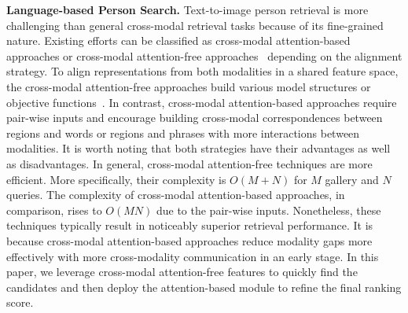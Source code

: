 \documentclass[sigconf]{acmart}
\begin{document}
\textbf{Language-based Person Search.}
Text-to-image person retrieval is more challenging than general cross-modal retrieval tasks because of its fine-grained nature. 
Existing efforts can be classified as cross-modal attention-based~\cite{li2017person, wang2022look, shu2023see, shao2022learning} approaches or cross-modal attention-free approaches~\cite{ding2021semantically, zheng2020dual, wang2022caibc, chen2022tipcb} depending on the alignment strategy.
To align representations from both modalities in a shared feature space, 
the cross-modal attention-free approaches build various model structures or objective functions~\cite{zheng2020dual}. 
In contrast, cross-modal attention-based approaches require pair-wise inputs and
encourage building cross-modal correspondences between regions and words or regions and phrases with more interactions between modalities. 
It is worth noting that both strategies have their advantages as well as disadvantages. 
In general, cross-modal attention-free techniques are more efficient. More specifically, their complexity is $O(M+N)$ for $M$ gallery and $N$ queries. 
The complexity of cross-modal attention-based approaches, in comparison, rises to $O(MN)$ due to the pair-wise inputs. 
Nonetheless, these techniques typically result in noticeably superior retrieval performance. 
It is because cross-modal attention-based approaches reduce modality gaps more effectively with more cross-modality communication in an early stage.
In this paper, we leverage cross-modal attention-free features to quickly find the candidates and then deploy the attention-based module to refine the final ranking score.
\end{document}
